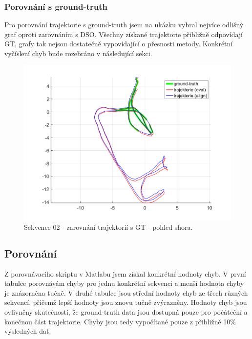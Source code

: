 \documentclass[12pt,a4paper]{article}
\begin{document}
\newpage
\subsubsection*{Porovnání s ground-truth}
Pro porovnání trajektorie s ground-truth jsem na ukázku vybral nejvíce odlišný graf oproti zarovnáním s DSO. Všechny získané trajektorie přibližně odpovídají  GT, grafy tak nejsou dostatečně vypovídající o přesnosti metody. Konkrétní vyčíslení chyb bude rozebráno v následující sekci.


\begin{figure}[H]
\centering
\includegraphics[width=1\textwidth]{img/m_ldso_02_2.png}
\caption{Sekvence 02 - zarovnání trajektorií s GT - pohled shora.}
\end{figure}

\subsection{Porovnání}
Z porovnávacího skriptu v Matlabu jsem získal konkrétní hodnoty chyb. V první tabulce porovnávám chyby pro jednu konkrétní sekvenci a menší hodnota chyby je znázorněna tučně. V druhé tabulce jsou střední hodnoty chyb ze třech různých sekvencí, přičemž lepší hodnoty jsou znovu tučně zvýrazněny. Hodnoty chyb jsou ovlivněny skutečností, že ground-truth data jsou dostupná pouze pro počáteční a konečnou část trajektorie. Chyby jsou tedy vypočítané pouze z přibližně 10\% výsledných dat. 
\end{document}
